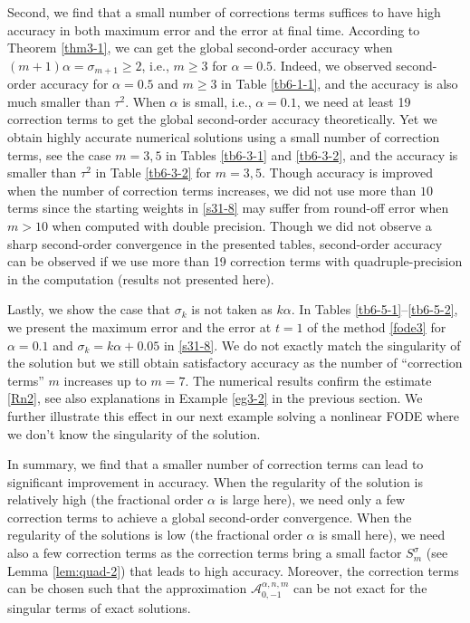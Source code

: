 \documentclass[10pt]{siamltex}
\begin{document}
Second,  we find that  a small number of  corrections terms  suffices to have high accuracy in both maximum error and the error at final time.
According to Theorem \ref{thm3-1}, we can get the global second-order accuracy when  $(m+1)\alpha=\sigma_{m+1} \geq2$, i.e.,   $m\geq 3$ for $\alpha=0.5$. Indeed, we observed second-order accuracy for $\alpha=0.5$ and $m\geq 3$ in Table \ref{tb6-1-1}, and the accuracy is also much smaller than $\tau^2$. When $\alpha$ is small, i.e., $\alpha=0.1$, we need at least 19 correction terms to get the global second-order accuracy theoretically. Yet we obtain highly accurate numerical solutions using a small number of correction terms, see the case $m=3,5$ in Tables \ref{tb6-3-1} and \ref{tb6-3-2}, and the accuracy is smaller than $\tau^2$ in Table \ref{tb6-3-2} for $m=3,5$.  Though   accuracy is improved when the number of correction terms increases,  we did not use more than $10$ terms since the starting weights in \eqref{s31-8} may suffer from round-off error when $m>10$ when computed with double precision.
%
Though we did not observe a sharp second-order
convergence in the presented tables, second-order accuracy can be observed if we use more than 19 correction terms with  quadruple-precision in the computation (results not presented here).





Lastly, we show  the case that $\sigma_k$ is not taken as $k\alpha$. In Tables \ref{tb6-5-1}--\ref{tb6-5-2}, we present the maximum error and the error at $t=1$ of the method \eqref{fode3} for  $\alpha=0.1$  and  $\sigma_k=k\alpha+0.05$ in \eqref{s31-8}.
We  do not exactly match the  singularity of the solution but we still obtain satisfactory accuracy as the number of ``correction terms'' $m$ increases up to $m=7$. The numerical results confirm  the estimate \eqref{Rn2}, see also explanations in Example \ref{eg3-2} in the previous section.  We further illustrate this effect in our next example solving a nonlinear FODE where we don't know the   singularity of the solution.

In summary,  we find that a smaller number of correction  terms can lead to significant improvement in accuracy.  When the regularity of the solution is relatively high (the fractional   order $\alpha$ is large here), we need  only a few correction  terms to achieve a global second-order convergence. When the regularity of the solutions is low (the fractional   order $\alpha$ is small here), we need also a few correction terms as the correction terms bring a small factor $S_{m}^\sigma$ (see Lemma \ref{lem:quad-2}) that leads to high accuracy. Moreover,
the correction terms can be chosen such that the approximation $\mathcal{{A}}_{0,-1}^{\alpha,n,m}$ can be not exact for the singular terms of exact solutions.
\end{document}
